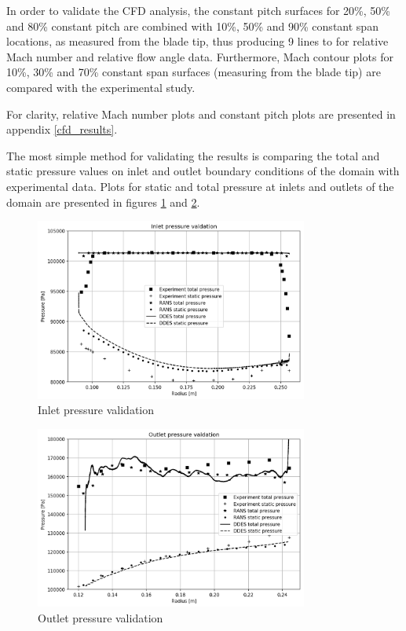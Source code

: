In order to validate the CFD analysis, the constant pitch surfaces for 20\%, 50\% and 80\% constant pitch are combined with 10\%, 50\% and 90\% constant span locations, as measured from the blade tip, thus producing 9 lines to for relative Mach number and relative flow angle data. Furthermore, Mach contour plots for 10\%, 30\% and 70\% constant span surfaces (measuring from the blade tip) are compared with the experimental study.

For clarity, relative Mach number plots and constant pitch plots are presented in appendix \ref{cfd_results}. 

The most simple method for validating the results is comparing the total and static pressure values on inlet and outlet boundary conditions of the domain with experimental data. Plots for static and total pressure at inlets and outlets of the domain are presented in figures \ref{pvalid_in} and \ref{pvalid_out}. 

\begin{figure}[h!]
\centering %
\includegraphics[width=0.8\textwidth]{Pictures/pvalid_in.png}
\caption{Inlet pressure validation}
\label{pvalid_in}
\end{figure}

\begin{figure}[h!]
\centering %
\includegraphics[width=0.8\textwidth]{Pictures/pvalid_out.png}
\caption{Outlet pressure validation}
\label{pvalid_out}
\end{figure}

